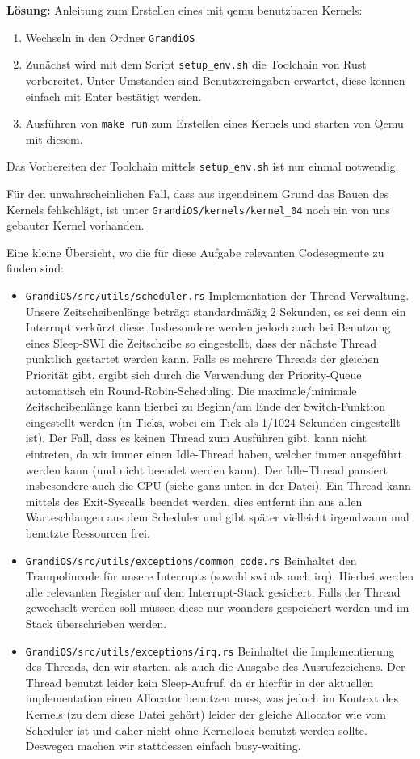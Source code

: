 \begin{description}
\textbf{Lösung:}
Anleitung zum Erstellen eines mit qemu benutzbaren Kernels:
\begin{enumerate}
  \item Wechseln in den Ordner \texttt{GrandiOS}
  \item Zunächst wird mit dem Script \texttt{setup\_env.sh} die Toolchain von Rust vorbereitet. Unter Umständen sind Benutzereingaben erwartet, diese können einfach mit Enter bestätigt werden.
  \item Ausführen von \texttt{make run} zum Erstellen eines Kernels und starten von Qemu mit diesem.
\end{enumerate}
Das Vorbereiten der Toolchain mittels \texttt{setup\_env.sh} ist nur einmal notwendig.

Für den unwahrscheinlichen Fall, dass aus irgendeinem Grund das Bauen des Kernels fehlschlägt, ist unter {\texttt{GrandiOS/kernels/kernel\_04}} noch ein von uns gebauter Kernel vorhanden.

Eine kleine Übersicht, wo die für diese Aufgabe relevanten Codesegmente zu finden sind:
\begin{itemize}
	\item \texttt{GrandiOS/src/utils/scheduler.rs} Implementation der Thread-Verwaltung. Unsere Zeitscheibenlänge beträgt standardmäßig 2 Sekunden, es sei denn ein Interrupt verkürzt diese. Insbesondere werden jedoch auch bei Benutzung eines Sleep-SWI die Zeitscheibe so eingestellt, dass der nächste Thread pünktlich gestartet werden kann. Falls es mehrere Threads der gleichen Priorität gibt, ergibt sich durch die Verwendung der Priority-Queue automatisch ein Round-Robin-Scheduling. Die maximale/minimale Zeitscheibenlänge kann hierbei zu Beginn/am Ende der Switch-Funktion eingestellt werden (in Ticks, wobei ein Tick als 1/1024 Sekunden eingestellt ist). Der Fall, dass es keinen Thread zum Ausführen gibt, kann nicht eintreten, da wir immer einen Idle-Thread haben, welcher immer ausgeführt werden kann (und nicht beendet werden kann). Der Idle-Thread pausiert insbesondere auch die CPU (siehe ganz unten in der Datei). Ein Thread kann mittels des Exit-Syscalls beendet werden, dies entfernt ihn aus allen Warteschlangen aus dem Scheduler und gibt später vielleicht irgendwann mal benutzte Ressourcen frei.
	\item \texttt{GrandiOS/src/utils/exceptions/common\_code.rs} Beinhaltet den Trampolincode für unsere Interrupts (sowohl swi als auch irq). Hierbei werden alle relevanten Register auf dem Interrupt-Stack gesichert. Falls der Thread gewechselt werden soll müssen diese nur woanders gespeichert werden und im Stack überschrieben werden.
	\item \texttt{GrandiOS/src/utils/exceptions/irq.rs} Beinhaltet die Implementierung des Threads, den wir starten, als auch die Ausgabe des Ausrufezeichens. Der Thread benutzt leider kein Sleep-Aufruf, da er hierfür in der aktuellen implementation einen Allocator benutzen muss, was jedoch im Kontext des Kernels (zu dem diese Datei gehört) leider der gleiche Allocator wie vom Scheduler ist und daher nicht ohne Kernellock benutzt werden sollte. Deswegen machen wir stattdessen einfach busy-waiting.
\end{itemize}

\end{description}

